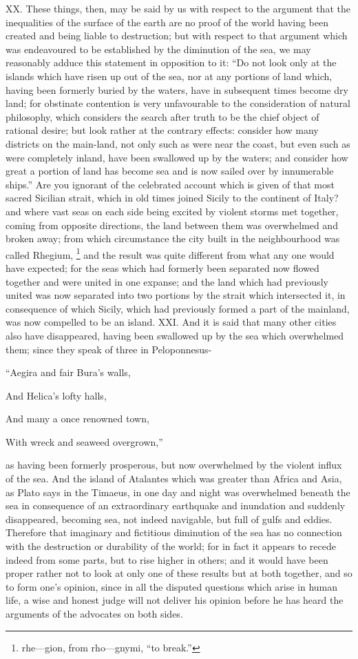 XX. These things, then, may be said by us with respect to the argument that the inequalities of the
surface of the earth are no proof of the world having been created and being liable to destruction;
but with respect to that argument which was endeavoured to be established by the diminution of the
sea, we may reasonably adduce this statement in opposition to it: ``Do not look only at the islands
which have risen up out of the sea, nor at any portions of land which, having been formerly buried
by the waters, have in subsequent times become dry land; for obstinate contention is very
unfavourable to the consideration of natural philosophy, which considers the search after truth to
be the chief object of rational desire; but look rather at the contrary effects: consider how many
districts on the main-land, not only such as were near the coast, but even such as were completely
inland, have been swallowed up by the waters; and consider how great a portion of land has
become sea and is now sailed over by innumerable ships.'' Are you ignorant of the celebrated
account which is given of that most sacred Sicilian strait, which in old times joined Sicily to the
continent of Italy? and where vast seas on each side being excited by violent storms met together,
coming from opposite directions, the land between them was overwhelmed and broken away; from
which circumstance the city built in the neighbourhood was called Rhegium, \footnote{rhe—gion, from
rho—gnymi, ``to break.''} and the result was quite different from what any one would have expected; for
the seas which had formerly been separated now flowed together and were united in one expanse;
and the land which had previously united was now separated into two portions by the strait which
intersected it, in consequence of which Sicily, which had previously formed a part of the mainland,
was now compelled to be an island. XXI. And it is said that many other cities also have
disappeared, having been swallowed up by the sea which overwhelmed them; since they speak of
three in Peloponnesus-

``Aegira and fair Bura's walls,

And Helica's lofty halls,

And many a once renowned town,

With wreck and seaweed overgrown,''

as having been formerly prosperous, but now overwhelmed by the violent influx of the sea. And the
island of Atalantes which was greater than Africa and Asia, as Plato says in the Timaeus, in one
day and night was overwhelmed beneath the sea in consequence of an extraordinary earthquake
and inundation and suddenly disappeared, becoming sea, not indeed navigable, but full of gulfs and
eddies. Therefore that imaginary and fictitious diminution of the sea has no connection with the
destruction or durability of the world; for in fact it appears to recede indeed from some parts, but to
rise higher in others; and it would have been proper rather not to look at only one of these results
but at both together, and so to form one's opinion, since in all the disputed questions which arise in
human life, a wise and honest judge will not deliver his opinion before he has heard the arguments
of the advocates on both sides.

